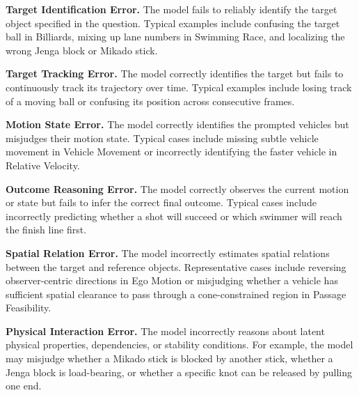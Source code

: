 \noindent\textbf{Target Identification Error.} %
The model fails to reliably identify the target object specified in the question.
Typical examples include confusing the target ball in Billiards, mixing up lane numbers in Swimming Race, and localizing the wrong Jenga block or Mikado stick.

\noindent\textbf{Target Tracking Error.} %
The model correctly identifies the target but fails to continuously track its trajectory over time.
Typical examples include losing track of a moving ball or confusing its position across consecutive frames.

\noindent\textbf{Motion State Error.} %
The model correctly identifies the prompted vehicles but misjudges their motion state.
Typical cases include missing subtle vehicle movement in Vehicle Movement or incorrectly identifying the faster vehicle in Relative Velocity.

\noindent\textbf{Outcome Reasoning Error.} %
The model correctly observes the current motion or state but fails to infer the correct final outcome.
Typical cases include incorrectly predicting whether a shot will succeed or which swimmer will reach the finish line first.

\noindent\textbf{Spatial Relation Error.} %
The model incorrectly estimates spatial relations between the target and reference objects.
Representative cases include reversing observer-centric directions in Ego Motion or misjudging whether a vehicle has sufficient spatial clearance to pass through a cone-constrained region in Passage Feasibility.

\noindent\textbf{Physical Interaction Error.} %
The model incorrectly reasons about latent physical properties, dependencies, or stability conditions.
For example, the model may misjudge whether a Mikado stick is blocked by another stick, whether a Jenga block is load-bearing, or whether a specific knot can be released by pulling one end.


